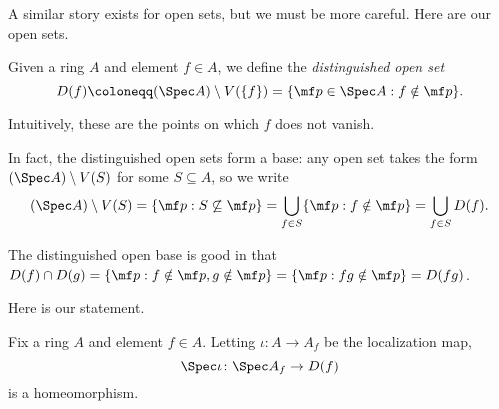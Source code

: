 \documentclass[../notes.tex]{subfiles}
\begin{document}
A similar story exists for open sets, but we must be more careful. Here are our open sets.
\begin{definition}
	Given a ring $A$ and element $f\in A$, we define the \textit{distinguished open set}
	\[D(f)\coloneqq(\Spec A)\setminus V(\{f\})=\{\mf p\in\Spec A:f\notin\mf p\}.\]
\end{definition}
Intuitively, these are the points on which $f$ does not vanish.
\begin{remark} \label{rem:distinguishedbase}
	In fact, the distinguished open sets form a base: any open set takes the form $(\Spec A)\setminus V(S)$ for some $S\subseteq A$, so we write
	\[(\Spec A)\setminus V(S)=\{\mf p:S\not\subseteq\mf p\}=\bigcup_{f\in S}\{\mf p:f\notin\mf p\}=\bigcup_{f\in S}D(f).\]
\end{remark}
\begin{remark} \label{rem:intersect-distinguished-base}
	The distinguished open base is good in that $D(f)\cap D(g)=\{\mf p:f\notin\mf p,g\notin\mf p\}=\{\mf p:fg\notin\mf p\}=D(fg)$.
\end{remark}
Here is our statement.
\begin{exe} \label{exe:distinguishedisaffine}
	Fix a ring $A$ and element $f\in A$. Letting $\iota\colon A\to A_f$ be the localization map,
	\[\Spec\iota\colon\Spec A_f\to D(f)\]
	is a homeomorphism.
\end{exe}
\end{document}
